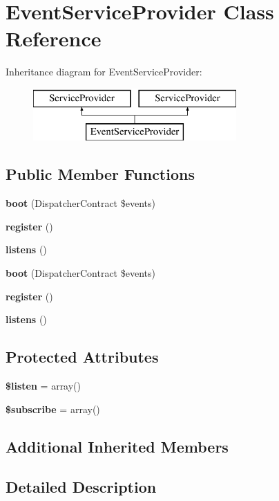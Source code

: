 \section{Event\+Service\+Provider Class Reference}
\label{class_illuminate_1_1_foundation_1_1_support_1_1_providers_1_1_event_service_provider}
Inheritance diagram for Event\+Service\+Provider\+:\begin{figure}[H]
\begin{center}
\leavevmode
\includegraphics[height=2.000000cm]{class_illuminate_1_1_foundation_1_1_support_1_1_providers_1_1_event_service_provider}
\end{center}
\end{figure}
\subsection*{Public Member Functions}
\begin{DoxyCompactItemize}
\item 
{\bf boot} (Dispatcher\+Contract \$events)
\item 
{\bf register} ()
\item 
{\bf listens} ()
\item 
{\bf boot} (Dispatcher\+Contract \$events)
\item 
{\bf register} ()
\item 
{\bf listens} ()
\end{DoxyCompactItemize}
\subsection*{Protected Attributes}
\begin{DoxyCompactItemize}
\item 
{\bf \$listen} = array()
\item 
{\bf \$subscribe} = array()
\end{DoxyCompactItemize}
\subsection*{Additional Inherited Members}


\subsection{Detailed Description}


